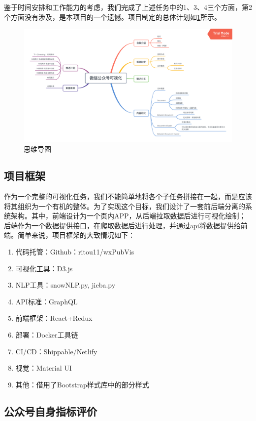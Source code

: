 \documentclass[a4paper,12pt]{article}
\begin{document}
    鉴于时间安排和工作能力的考虑，我们完成了上述任务中的1、3、4三个方面，第2个方面没有涉及，是本项目的一个遗憾。项目制定的总体计划如\cref{fig:taskmindmap}所示。
    \begin{figure}
      \centering
      \includegraphics[width=0.95\linewidth]{TasksMindmap.png}
      \caption{思维导图}
      \label{fig:taskmindmap}
    \end{figure}
    \subsection{项目框架}
    作为一个完整的可视化任务，我们不能简单地将各个子任务拼接在一起，而是应该将其组织为一个有机的整体。为了实现这个目标，我们设计了一套前后端分离的系统架构。其中，前端设计为一个页内APP，从后端拉取数据后进行可视化绘制；后端作为一个数据提供接口，在爬取数据后进行处理，并通过api将数据提供给前端。简单来说，项目框架的大致情况如下：
    \begin{enumerate}
      \item 代码托管：Github：ritou11/wxPubVis
      \item 可视化工具：D3.js
      \item NLP工具：snowNLP.py, jieba.py
      \item API标准：GraphQL
      \item 前端框架：React+Redux
      \item 部署：Docker工具链
      \item CI/CD：Shippable/Netlify
      \item 视觉：Material UI
      \item 其他：借用了Bootstrap样式库中的部分样式
    \end{enumerate}
    \subsection{公众号自身指标评价}
\end{document}
